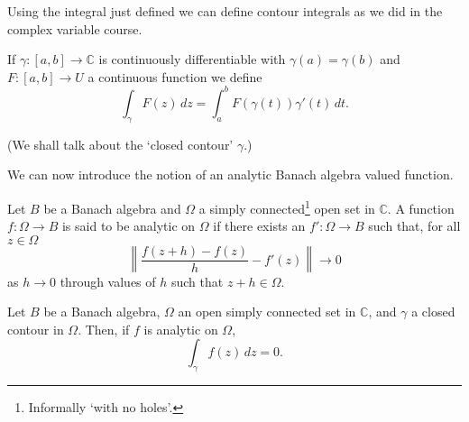 Using the integral just defined we can define
contour integrals as we did in the complex variable course.
\begin{definition} If $\gamma:[a,b]\rightarrow{\mathbb C}$
is continuously differentiable with $\gamma(a)=\gamma(b)$
and 
$F:[a,b]\rightarrow U$ a continuous function
we define
\[\int_{\gamma}F(z)\,dz=\int_{a}^{b}F(\gamma(t))\gamma'(t)\,dt.\]
\end{definition}
(We shall talk about the `closed contour' $\gamma$.)         

We can now introduce the notion of an
analytic Banach algebra valued function.
\begin{definition} Let $B$ be a Banach algebra
and $\Omega$ a simply connected\footnote{Informally `with no holes'.}
open set in ${\mathbb C}$.
A function $f:\Omega\rightarrow B$ is said to be analytic
on $\Omega$ if there exists an $f':\Omega\rightarrow B$
such that, for all $z\in \Omega$
\[\left\|\frac{f(z+h)-f(z)}{h}-f'(z)\right\|\rightarrow 0\]
as $h\rightarrow 0$ through values of $h$
such that $z+h\in\Omega$.
\end{definition}
\begin{theorem} Let $B$ be a Banach algebra,
$\Omega$ an open simply connected set in ${\mathbb C}$,
and $\gamma$ a closed contour in $\Omega$.
Then, if $f$ is analytic on $\Omega$,
\[\int_{\gamma}f(z)\,dz=0.\]
\end{theorem}

